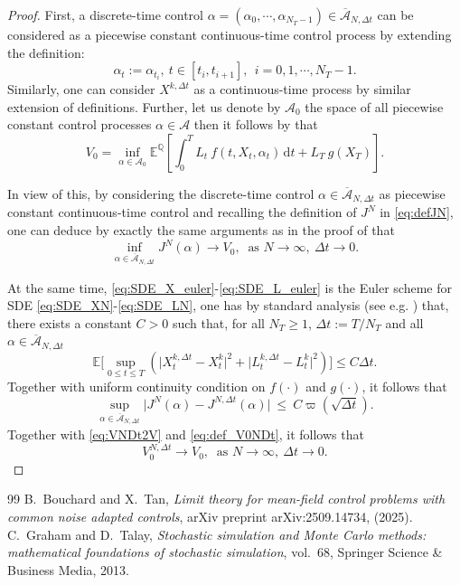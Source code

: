 \documentclass[10pt,a4paper]{amsart}
\newcommand{\bE}{\mathbb{E}}
\newcommand{\dd}{\mathrm{d}}
\begin{document}
	\begin{proof}
		First, a discrete-time control $\alpha = (\alpha_0, \cdots, \alpha_{N_T-1}) \in \overline{\mathcal{A}}_{N, \Delta t}$ can be considered as a piecewise constant continuous-time control process by extending the definition:
		$$
		\alpha_t := \alpha_{t_i}, ~t \in [t_i, t_{i+1}], ~~i = 0, 1, \cdots, N_T-1.
		$$
		Similarly, one can consider $X^{k,\Delta t}$ as a continuous-time process by similar extension of definitions.
		Further, let us denote by $\mathcal{A}_0$ the space  of all  piecewise constant control processes $\alpha \in \mathcal{A}$
		then it follows by \cite[Proposition A.5]{bouchard2025limit} that 
		$$
		V_0 = \inf_{\alpha \in \mathcal{A}_0} \mathbb{E}^{\mathbb{Q}} 
		\left[ 
		\int_0^T L_t ~f(t, X_t,  \alpha_t)\,\dd t 
		+
		L_T~ g(X_T) 
		\right]. 
		$$
		
		In view of this, by considering the discrete-time control $\alpha \in \overline{\mathcal{A}}_{N, \Delta t}$ as piecewise constant continuous-time control and recalling the definition of $J^N$ in \eqref{eq:defJN},
		one can deduce by exactly the same arguments as in the proof of \cite[Theorem 3.2]{bouchard2025limit} that
		\begin{equation} \label{eq:VNDt2V}
			\inf_{\alpha \in \overline{\mathcal{A}}_{N, \Delta t}} J^N(\alpha) \longrightarrow V_0,
			~\text{ as }N\longrightarrow \infty,~ \Delta t \longrightarrow 0. 
		\end{equation}
		
		At the same time, \eqref{eq:SDE_X_euler}-\eqref{eq:SDE_L_euler} is the Euler scheme for SDE \eqref{eq:SDE_XN}-\eqref{eq:SDE_LN},
		one has by standard analysis (see e.g. \cite{graham2013stochastic}) that, there exists a constant $C> 0$ such that,
		for all $N_T \ge 1$, $\Delta t:= T/N_T$ and all $\alpha \in \overline{\mathcal{A}}_{N, \Delta t}$
		$$
		\bE \Big[ \sup_{0 \le t \le T} \left(\big| X^{k,\Delta t}_t - X^k_t \big|^2 + \big|L_t^{k,\Delta t} - L_t^k\big|^2 \right) \Big] \le C \Delta t.
		$$
		Together with uniform continuity condition on $f(\cdot)$ and $g(\cdot)$, it follows that
		$$
		\sup_{\alpha \in \overline{\mathcal{A}}_{N, \Delta t}} \big| J^N(\alpha) - J^{N, \Delta t} (\alpha) \big| 
		~\le~
		C \varpi(\sqrt{\Delta t}).
		$$
		Together with \eqref{eq:VNDt2V} and \eqref{eq:def_V0NDt}, it follows that
		$$
		V_0^{N, \Delta t} \longrightarrow V_0,  ~\text{ as }N\longrightarrow \infty,~ \Delta t \longrightarrow 0. 
		$$
	\end{proof}

\begin{thebibliography}{99}
 {\sc B.~Bouchard and X.~Tan}, {\em Limit theory for mean-field control problems with common noise adapted controls}, arXiv preprint arXiv:2509.14734, (2025).
 {\sc C.~Graham and D.~Talay}, {\em Stochastic simulation and {M}onte {C}arlo methods: mathematical foundations of stochastic simulation}, vol.~68, Springer Science \& Business Media, 2013.
\end{thebibliography}
\end{document}
